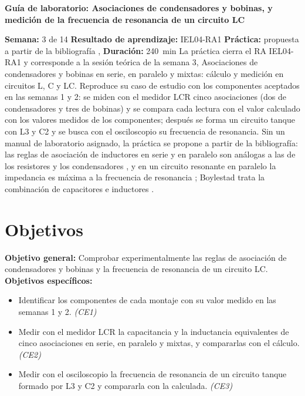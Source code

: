 \documentclass[12pt]{article}
\begin{document}
\nocite{ref1,ref2}

\datosguia
\lineablanco

{\centering\bfseries Guía de laboratorio: Asociaciones de condensadores y bobinas, y medición de la frecuencia de resonancia de un circuito LC\par}
\lineablanco
\textbf{Semana:} 3 de 14 \quad \textbf{Resultado de aprendizaje:} IEL04-RA1 \quad \textbf{Práctica:} propuesta a partir de la bibliografía \cite{ref1}, \cite{ref2} \quad \textbf{Duración:} \SI{240}{\minute}
\lineablanco
La práctica cierra el RA IEL04-RA1 y corresponde a la sesión teórica de la semana 3, \guillemotleft{}Asociaciones de condensadores y bobinas en serie, en paralelo y mixtas: cálculo y medición en circuitos L, C y LC\guillemotright{}. Reproduce su caso de estudio con los componentes aceptados en las semanas 1 y 2: se miden con el medidor LCR cinco asociaciones (dos de condensadores y tres de bobinas) y se compara cada lectura con el valor calculado con los valores medidos de los componentes; después se forma un circuito tanque con L3 y C2 y se busca con el osciloscopio su frecuencia de resonancia. Sin un manual de laboratorio asignado, la práctica se propone a partir de la bibliografía: las reglas de asociación de inductores en serie y en paralelo son análogas a las de los resistores y los condensadores \cite{ref1}, y en un circuito resonante en paralelo la impedancia es máxima a la frecuencia de resonancia \cite{ref1}; Boylestad trata la combinación de capacitores e inductores \cite{ref2}.

\section{Objetivos}\label{sec:objetivos}
\textbf{Objetivo general:} Comprobar experimentalmente las reglas de asociación de condensadores y bobinas y la frecuencia de resonancia de un circuito LC.
\lineablanco
\textbf{Objetivos específicos:}
\begin{itemize}
  \item Identificar los componentes de cada montaje con su valor medido en las semanas 1 y 2. \emph{(CE1)}
  \item Medir con el medidor LCR la capacitancia y la inductancia equivalentes de cinco asociaciones en serie, en paralelo y mixtas, y compararlas con el cálculo. \emph{(CE2)}
  \item Medir con el osciloscopio la frecuencia de resonancia de un circuito tanque formado por L3 y C2 y compararla con la calculada. \emph{(CE3)}
\end{itemize}
\end{document}

